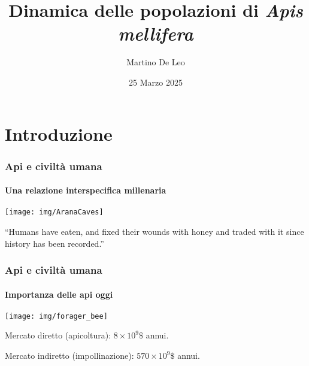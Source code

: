 \documentclass[]{beamer}
\title{Dinamica delle popolazioni di \emph{Apis mellifera}}
\author[]{Martino De Leo}
\date{25 Marzo 2025}
\begin{document}

\section{Introduzione}


\begin{frame}
    \maketitle
\end{frame}


\begin{frame}
    \frametitle{Api e civiltà umana}
    \framesubtitle{Una relazione interspecifica millenaria}

    \begin{center}
        \texttt{[image: img/AranaCaves]}
    \end{center}

    \begin{displayquote}
        ``Humans have eaten, and fixed their wounds with honey and traded with it since history has been recorded.''
    \end{displayquote}
\end{frame}


\begin{frame}
    \frametitle{Api e civiltà umana}
    \framesubtitle{Importanza delle api oggi}

    \begin{center}
        \texttt{[image: img/forager\_bee]}
    \end{center}

    Mercato diretto (apicoltura): $8 \times 10^9 \$$ annui.

    \pause
    Mercato indiretto (impollinazione): $570 \times 10^9 \$$ annui.
\end{frame}
\end{document}
